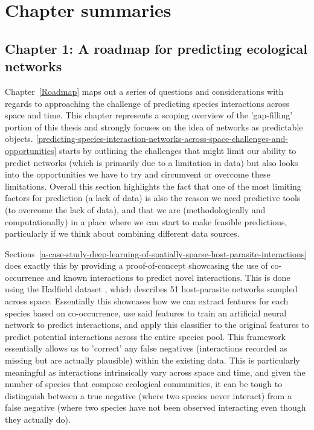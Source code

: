 \section{Chapter summaries}

\subsection{Chapter 1: A roadmap for predicting ecological networks}

Chapter~\ref{Roadmap} maps out a series of questions and considerations with regards to approaching the challenge of predicting species interactions across space and time. This chapter represents a scoping overview of the 'gap-filling' portion of this thesis and strongly focuses on the idea of networks as predictable objects. \autoref{predicting-species-interaction-networks-across-space-challenges-and-opportunities} starts by outlining the challenges that might limit our ability to predict networks (which is primarily due to a limitation in data) but also looks into the opportunities we have to try and circumvent or overcome these limitations. Overall this section highlights the fact that one of the most limiting factors for prediction (a lack of data) is also the reason we need predictive tools (to overcome the lack of data), and that we are (methodologically and computationally) in a place where we can start to make feasible predictions, particularly if we think about combining different data sources.

Sections~\ref{a-case-study-deep-learning-of-spatially-sparse-host-parasite-interactions} does exactly this by providing a proof-of-concept showcasing the use of co-occurrence and known interactions to predict novel interactions. This is done using the Hadfield dataset \cite{Hadfield2014TalTwo}, which describes 51 host-parasite networks sampled across space. Essentially this showcases how we can extract features for each species based on co-occurrence, use said features to train an artificial neural network to predict interactions, and apply this classifier to the original features to predict potential interactions across the entire species pool. This framework essentially allows us to 'correct' any false negatives (interactions recorded as missing but are actually plausible) within the existing data. This is particularly meaningful as interactions intrinsically vary across space and time, and given the number of species that compose ecological communities, it can be tough to distinguish between a true negative (where two species never interact) from a false negative (where two species have not been observed interacting even though they actually do).

